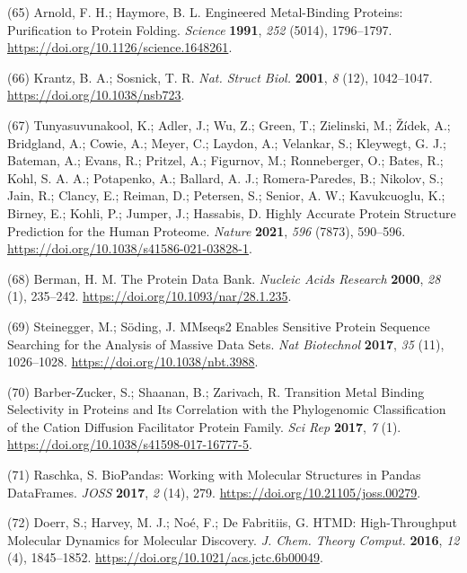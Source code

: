 \documentclass[  ASAPversion,
  ,
  9pt]{elife}
\newenvironment{cslreferences}%
  {}%
  {\par}
\begin{document}
\begin{cslreferences}
\leavevmode\hypertarget{ref-15drt0nXZ}{}%
(65) Arnold, F. H.; Haymore, B. L. Engineered Metal-Binding Proteins: Purification to Protein Folding. \emph{Science} \textbf{1991}, \emph{252} (5014), 1796--1797. \url{https://doi.org/10.1126/science.1648261}.

\leavevmode\hypertarget{ref-85PeY3aG}{}%
(66) Krantz, B. A.; Sosnick, T. R. \emph{Nat. Struct Biol.} \textbf{2001}, \emph{8} (12), 1042--1047. \url{https://doi.org/10.1038/nsb723}.

\leavevmode\hypertarget{ref-10bYywzs6}{}%
(67) Tunyasuvunakool, K.; Adler, J.; Wu, Z.; Green, T.; Zielinski, M.; Žídek, A.; Bridgland, A.; Cowie, A.; Meyer, C.; Laydon, A.; Velankar, S.; Kleywegt, G. J.; Bateman, A.; Evans, R.; Pritzel, A.; Figurnov, M.; Ronneberger, O.; Bates, R.; Kohl, S. A. A.; Potapenko, A.; Ballard, A. J.; Romera-Paredes, B.; Nikolov, S.; Jain, R.; Clancy, E.; Reiman, D.; Petersen, S.; Senior, A. W.; Kavukcuoglu, K.; Birney, E.; Kohli, P.; Jumper, J.; Hassabis, D. Highly Accurate Protein Structure Prediction for the Human Proteome. \emph{Nature} \textbf{2021}, \emph{596} (7873), 590--596. \url{https://doi.org/10.1038/s41586-021-03828-1}.

\leavevmode\hypertarget{ref-8cYXwVxI}{}%
(68) Berman, H. M. The Protein Data Bank. \emph{Nucleic Acids Research} \textbf{2000}, \emph{28} (1), 235--242. \url{https://doi.org/10.1093/nar/28.1.235}.

\leavevmode\hypertarget{ref-jj6qOofE}{}%
(69) Steinegger, M.; Söding, J. MMseqs2 Enables Sensitive Protein Sequence Searching for the Analysis of Massive Data Sets. \emph{Nat Biotechnol} \textbf{2017}, \emph{35} (11), 1026--1028. \url{https://doi.org/10.1038/nbt.3988}.

\leavevmode\hypertarget{ref-FB5cckAJ}{}%
(70) Barber-Zucker, S.; Shaanan, B.; Zarivach, R. Transition Metal Binding Selectivity in Proteins and Its Correlation with the Phylogenomic Classification of the Cation Diffusion Facilitator Protein Family. \emph{Sci Rep} \textbf{2017}, \emph{7} (1). \url{https://doi.org/10.1038/s41598-017-16777-5}.

\leavevmode\hypertarget{ref-CcRTAd7h}{}%
(71) Raschka, S. BioPandas: Working with Molecular Structures in Pandas DataFrames. \emph{JOSS} \textbf{2017}, \emph{2} (14), 279. \url{https://doi.org/10.21105/joss.00279}.

\leavevmode\hypertarget{ref-q2gxO5bP}{}%
(72) Doerr, S.; Harvey, M. J.; Noé, F.; De Fabritiis, G. HTMD: High-Throughput Molecular Dynamics for Molecular Discovery. \emph{J. Chem. Theory Comput.} \textbf{2016}, \emph{12} (4), 1845--1852. \url{https://doi.org/10.1021/acs.jctc.6b00049}.


\end{cslreferences}
\end{document}
